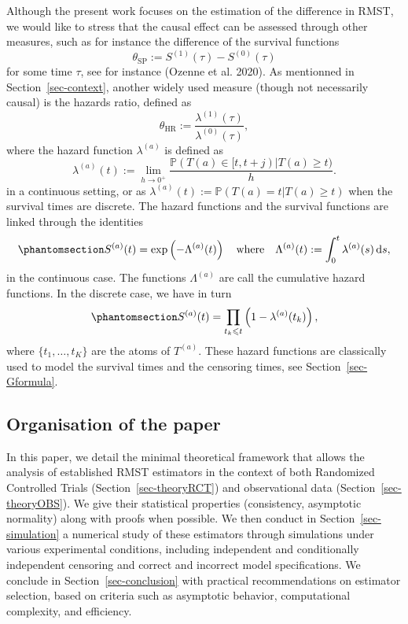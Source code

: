 \documentclass[
  11pt,
  a4paper,
]{article}
\theoremstyle{plain}
\theoremstyle{plain}
\theoremstyle{plain}
\theoremstyle{definition}
\theoremstyle{remark}
\begin{document}
Although the present work focuses on the estimation of the difference in
RMST, we would like to stress that the causal effect can be assessed
through other measures, such as for instance the difference of the
survival functions \[
\theta_{\mathrm{SP}} := S^{(1)}(\tau) - S^{(0)}(\tau) 
\] for some time \(\tau\), see for instance (Ozenne et al. 2020). As
mentionned in Section~\ref{sec-context}, another widely used measure
(though not necessarily causal) is the hazards ratio, defined as \[
\theta_{\mathrm{HR}} := \frac{\lambda^{(1)}(\tau)}{\lambda^{(0)}(\tau)},
\] where the hazard function \(\lambda^{(a)}\) is defined as \[
\lambda^{(a)}(t) := \lim_{h \to 0^+}\frac{\mathbb{P}(T(a) \in [t,t+j)|T(a) \geqslant t)}{h}.
\] in a continuous setting, or as
\(\lambda^{(a)}(t) := \mathbb{P}(T(a) = t|T(a) \geqslant t)\) when the
survival times are discrete. The hazard functions and the survival
functions are linked through the identities
\begin{equation}\phantomsection\label{eq-lambdacont}{
S^{(a)}(t) = \exp\left(-\Lambda^{(a)}(t)\right) \quad \text{where} \quad \Lambda^{(a)}(t) := \int_0^t \lambda^{(a)}(s)\mathop{}\!\mathrm{d}s,
}\end{equation} in the continuous case. The functions \(\Lambda^{(a)}\)
are call the cumulative hazard functions. In the discrete case, we have
in turn \begin{equation}\phantomsection\label{eq-lambdadisc}{
S^{(a)}(t) = \prod_{t_k \leqslant t} \left(1-\lambda^{(a)}(t_k)\right),
}\end{equation} where \(\{t_1,\dots,t_K\}\) are the atoms of
\(T^{(a)}\). These hazard functions are classically used to model the
survival times and the censoring times, see Section~\ref{sec-Gformula}.

\subsection{Organisation of the paper}\label{organisation-of-the-paper}

In this paper, we detail the minimal theoretical framework that allows
the analysis of established RMST estimators in the context of both
Randomized Controlled Trials (Section~\ref{sec-theoryRCT}) and
observational data (Section~\ref{sec-theoryOBS}). We give their
statistical properties (consistency, asymptotic normality) along with
proofs when possible. We then conduct in Section~\ref{sec-simulation} a
numerical study of these estimators through simulations under various
experimental conditions, including independent and conditionally
independent censoring and correct and incorrect model specifications. We
conclude in Section~\ref{sec-conclusion} with practical recommendations
on estimator selection, based on criteria such as asymptotic behavior,
computational complexity, and efficiency.
\end{document}
